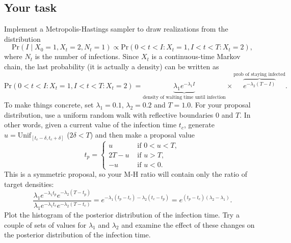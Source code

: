 \documentclass[11pt]{article}
\numberwithin{algorithm}{section}
\theoremstyle{remark}
\theoremstyle{definition}
\numberwithin{equation}{section}
\numberwithin{figure}{section}
\begin{document}
\subsection*{Your task}
Implement a Metropolis-Hastings sampler to draw realizations from the distribution 
\[
\text{Pr}(I \mid X_0=1, X_t=2, N_t=1) \propto \text{Pr}(0<t<I: X_t=1, I<t<T: X_t=2),
\] 
where $N_t$ is the number of infections. Since $X_t$ is a continuous-time Markov chain, the last 
probability (it is actually a density) can be written as
\[
\text{Pr}(0<t<I: X_t=1, I<t<T: X_t=2) = \underbrace{\lambda_1 e^{-\lambda_1 I}}_{\text{density of waiting time until infection}} 
\times \overbrace{e^{-\lambda_2 (T-I)}}^{\text{prob of staying infected}}.
\]
To make things concrete, set $\lambda_1 = 0.1$, $\lambda_2=0.2$ and $T=1.0$. For your proposal distribution, use 
a uniform random walk with reflective boundaries $0$ and $T$. In other words, given a current value of the infection
time $t_c$, generate $u = \text{Unif}_{[t_c-\delta,t_c+\delta]}$ ($2\delta < T$) and then make a proposal value
\[
t_p = 
\begin{cases}
  u &\text{ if } 0 < u < T,\\
  2T - u &\text{ if } u > T,\\
  -u &\text{ if } u < 0.
\end{cases}
\]
This is a symmetric proposal, so your M-H ratio will contain only the ratio of target densities:
\[
\frac{\lambda_1 e^{-\lambda_1 t_p}e^{-\lambda_2 (T-t_p)}}{\lambda_1 e^{-\lambda_1 t_c}e^{-\lambda_2 (T-t_c)}} = 
e^{-\lambda_1(t_p - t_c) -\lambda_2(t_c-t_p)} = e^{(t_p-t_c)(\lambda_2-\lambda_1)}.
\]
Plot the histogram of the posterior distribution of the infection time. Try a couple of sets of values for $\lambda_1$ and $\lambda_2$ and examine
the effect of these changes on the posterior distribution of the infection time.
\end{document}
